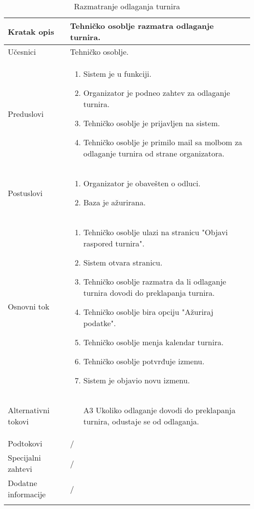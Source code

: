 \documentclass{article}
\begin{document}
 \begin{longtable}{| p{} | p{} |} 
            \hline
                Kratak opis & Tehničko osoblje razmatra odlaganje turnira. \\ 
            \hline    
                Učesnici & Tehničko osoblje.\\
            \hline
               Preduslovi & \begin{enumerate}
                   \item Sistem je u funkciji.
                   \item Organizator je podneo zahtev za odlaganje turnira.
                   \item Tehničko osoblje je prijavljen na sistem. 
                   \item Tehničko osoblje je primilo mail sa molbom za odlaganje turnira od strane organizatora.
                \end{enumerate}\\
            \hline  
                Postuslovi & \begin{enumerate}
                   \item Organizator je obavešten o odluci.
                   \item Baza je ažurirana. 
                \end{enumerate}\\
            \hline
                Osnovni tok & \begin{enumerate}
                    \item Tehničko osoblje ulazi na stranicu "Objavi raspored turnira".
                    \item Sistem otvara stranicu.
                    \item Tehničko osoblje razmatra da li odlaganje turnira dovodi do preklapanja turnira.
                    \item Tehničko osoblje bira opciju "Ažuriraj podatke".
                    \item Tehničko osoblje menja kalendar turnira.
                    \item Tehničko osoblje potvrđuje izmenu.
                    \item Sistem je objavio novu izmenu.
                \end{enumerate}\\
            \hline
                Alternativni tokovi & 
                \begin{itemize}
                    \item[A3] Ukoliko odlaganje dovodi do preklapanja turnira, odustaje se od odlaganja.
                \end{itemize}\\
            \hline
                Podtokovi & /\\
            \hline
                Specijalni zahtevi & /\\
            \hline
                Dodatne informacije & /\\
            \hline
            \caption{Razmatranje odlaganja turnira}
        \end{longtable}
\end{document}
